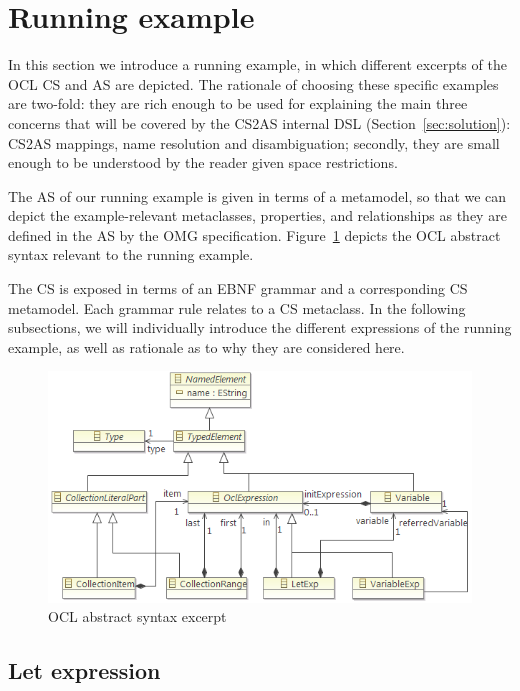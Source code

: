 \documentclass{llncs}
\begin{document}
\section{Running example}
\label{sec:example}

In this section we introduce a running example, in which different excerpts of the OCL CS and AS are depicted. The rationale of choosing these specific examples are two-fold: they are rich enough to be used for explaining the main three concerns that will be covered by the CS2AS internal DSL (Section~\ref{sec:solution}): CS2AS mappings, name resolution and disambiguation; secondly, they are small enough to be understood by the reader given space restrictions.

The AS of our running example is given in terms of a metamodel, so that we can depict the example-relevant metaclasses, properties, and relationships as they are defined in the AS by the OMG specification. Figure~\ref{fig:exampleAS} depicts the OCL abstract syntax relevant to the running example. 

The CS is exposed in terms of an EBNF grammar and a corresponding CS metamodel. Each grammar rule relates to a CS metaclass. In the following subsections, we will individually introduce the different expressions of the running example, as well as rationale as to why they are considered here.

\begin{figure}[htbp]
\centering
\includegraphics[scale=0.75]{images/RunningaExampleAS.png}
\caption{OCL abstract syntax excerpt}
\label{fig:exampleAS}
\end{figure}


\subsection{Let expression}
\end{document}
